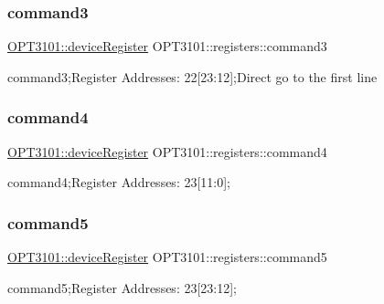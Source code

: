 \subsubsection{\texorpdfstring{command3}{command3}}
{\footnotesize\ttfamily \mbox{\hyperlink{class_o_p_t3101_1_1device_register}{O\+P\+T3101\+::device\+Register}} O\+P\+T3101\+::registers\+::command3}



command3;Register Addresses\+: 22\mbox{[}23\+:12\mbox{]};Direct go to the first line 

\mbox{\label{class_o_p_t3101_1_1registers_a6d75c4085fce9ed59248333a9794f598}} 
\subsubsection{\texorpdfstring{command4}{command4}}
{\footnotesize\ttfamily \mbox{\hyperlink{class_o_p_t3101_1_1device_register}{O\+P\+T3101\+::device\+Register}} O\+P\+T3101\+::registers\+::command4}



command4;Register Addresses\+: 23\mbox{[}11\+:0\mbox{]}; 

\mbox{\label{class_o_p_t3101_1_1registers_a3bf72d48f4b09c4ae74943640c21e7f2}} 
\subsubsection{\texorpdfstring{command5}{command5}}
{\footnotesize\ttfamily \mbox{\hyperlink{class_o_p_t3101_1_1device_register}{O\+P\+T3101\+::device\+Register}} O\+P\+T3101\+::registers\+::command5}



command5;Register Addresses\+: 23\mbox{[}23\+:12\mbox{]}; 

\mbox{\label{class_o_p_t3101_1_1registers_aa0a0ddc43fbfdd673bfd3fd794e6205c}} 

